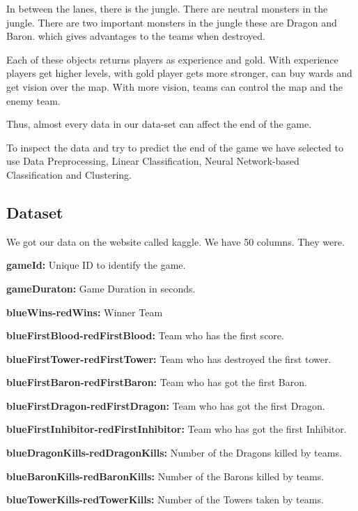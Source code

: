 \documentclass[a4paper]{article}
\begin{document}
\medskip

In between the lanes, there is the jungle. There are neutral monsters in the jungle. There are two important monsters in the jungle these are Dragon and Baron. which gives advantages to the teams when destroyed. 

\medskip 

Each of these objects returns players as experience and gold. With experience players get higher levels, with gold player gets more stronger, can buy wards and get vision over the map. With more vision, teams can control the map and the enemy team.

\medskip 

Thus, almost every data in our data-set can affect the end of the game.

\medskip 

To inspect the data and try to predict the end of the game we have selected to use Data Preprocessing, Linear Classification, Neural Network-based Classification and Clustering.

\medskip

\subsection{Dataset}
We got our data on the website called kaggle. We have 50 columns. They were.

\medskip

\textbf{gameId:} 
Unique ID to identify the game.

\textbf{gameDuraton:} 
Game Duration in seconds.

\textbf{blueWins-redWins:} 
Winner Team

\textbf{blueFirstBlood-redFirstBlood:} 
Team who has the first score.

\textbf{blueFirstTower-redFirstTower:} 
Team who has destroyed the first tower.

\textbf{blueFirstBaron-redFirstBaron:} 
Team who has got the first Baron.

\textbf{blueFirstDragon-redFirstDragon:} 
Team who has got the first Dragon.

\textbf{blueFirstInhibitor-redFirstInhibitor:} 
Team who has got the first Inhibitor.

\textbf{blueDragonKills-redDragonKills:} 
Number of the Dragons killed by teams.

\textbf{blueBaronKills-redBaronKills:} 
Number of the Barons killed by teams.

\textbf{blueTowerKills-redTowerKills:} 
Number of the Towers taken by teams.
\end{document}
